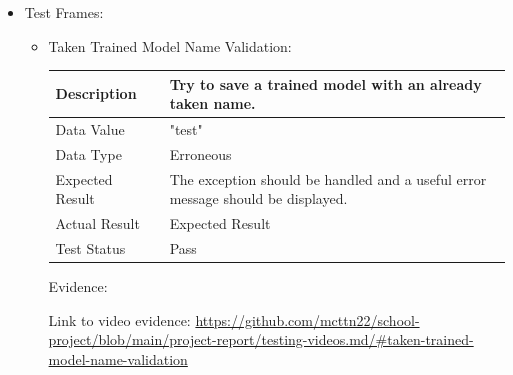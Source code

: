 \documentclass[./project-report/src/latex/project-report.tex]{subfiles}
\begin{document}
\begin{itemize}
    \item Test Frames:
    \label{sec:test-frames-input-validation}
    \begin{itemize}
        \item Taken Trained Model Name Validation: \newline\newline
			\begin{tabular}{|p{0.25\linewidth}|p{0.75\linewidth}|}
				\hline
				Description & Try to save a trained model with an already taken name. \\
				\hline
				Data Value & "test" \\
				\hline
				Data Type & Erroneous \\
				\hline
				Expected Result & The exception should be handled and a useful error message should be displayed. \\
				\hline
				Actual Result & Expected Result \\
				\hline
				Test Status & Pass \\
				\hline
			\end{tabular}

			\vspace{5mm}

            Evidence:
			\begin{figure}[h!]
			\centering
			\end{figure}

			Link to video evidence: \url{https://github.com/mcttn22/school-project/blob/main/project-report/testing-videos.md/#taken-trained-model-name-validation}


\end{itemize}
\end{itemize}
\end{document}
